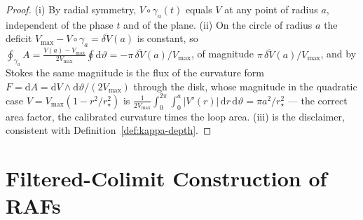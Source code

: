 \documentclass[11pt,a4paper]{article}
\theoremstyle{plain}
\theoremstyle{definition}
\theoremstyle{remark}
\begin{document}
\begin{proof}
(i) By radial symmetry, $V \circ \gamma_a(t)$ equals $V$ at any
point of radius $a$, independent of the phase $t$ and of the plane.
(ii) On the circle of radius $a$ the deficit
$V_{\max} - V \circ \gamma_a = \overline{\delta V}(a)$ is constant,
so $\oint_{\gamma_a} A = \frac{V(a)-V_{\max}}{2V_{\max}}
\oint \mathrm{d}\vartheta =
-\pi\,\overline{\delta V}(a)/V_{\max}$, of magnitude
$\pi\,\overline{\delta V}(a)/V_{\max}$,
and by Stokes the same magnitude is the flux of the curvature form
$F = \mathrm{d}A = \mathrm{d}V \wedge \mathrm{d}\vartheta/(2V_{\max})
$ through the disk, whose magnitude in the quadratic case
$V = V_{\max}(1 - r^2/r_\star^2)$ is
$\tfrac{1}{2V_{\max}}\int_{0}^{2\pi}\!\!\int_{0}^{a} |V'(r)|\,
\mathrm{d}r\,\mathrm{d}\vartheta = \pi a^2/r_\star^{2}$ --- the
correct area factor, the calibrated curvature times the loop area.
(iii) is the disclaimer, consistent with
Definition~\ref{def:kappa-depth}.
\end{proof}


\section{Filtered-Colimit Construction of RAFs}\label{sec:invlim}
\end{document}
